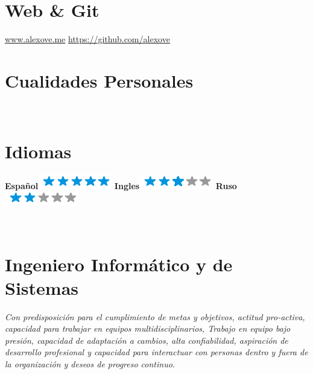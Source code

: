 \documentclass[]{friggeri-cv}
\begin{document}
\begin{aside}
    \section{Web \& Git}
    \href{http://alexove.me}{www.alexove.me}
    \href{https://github.com/alexove}{https://github.com/alexove}
    ~
    \section{Cualidades Personales}
    ~
    \section{Idiomas}
    \textbf{Espa\~nol}\includegraphics[scale=0.40]{img/5stars.png}
    \textbf{Ingles}\includegraphics[scale=0.40]{img/3stars.png}
    \textbf{Ruso}\includegraphics[scale=0.40]{img/2stars.png}
    ~
\end{aside}
~
\section{Ingeniero Inform\'atico y de Sistemas}
\emph{Con predisposici\'on para el cumplimiento de metas y objetivos, actitud pro-activa,
capacidad para trabajar en equipos multidisciplinarios, Trabajo en equipo bajo presi\'on,
capacidad de adaptaci\'on a cambios, alta confiabilidad, aspiraci\'on de desarrollo
profesional y capacidad para interactuar con personas dentro y fuera de la organizaci\'on y
deseos de progreso continuo.}
\\
\end{document}
